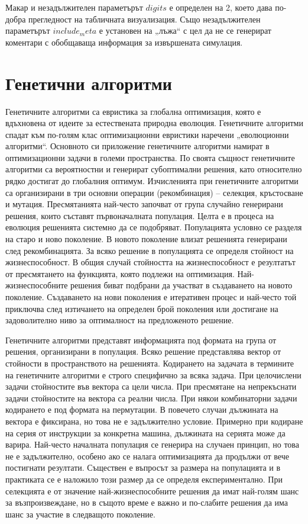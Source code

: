 Макар и незадължителен параметърът $digits$ е определен на 2, което дава по-добра прегледност на табличната визуализация. Също незадължителен параметърът $include_meta$ е установен на „лъжа“ с цел да не се генерират коментари с обобщаваща информация за извършената симулация. 

\section{Генетични алгоритми}

Генетичните алгоритми са евристика за глобална оптимизация, която е вдъхновена от идеите за естествената природна еволюция. Генетичните алгоритми спадат към по-голям клас оптимизационни евристики наречени „еволюционни алгоритми“. Основното си приложение генетичните алгоритми намират в оптимизационни задачи в големи пространства. По своята същност генетичните алгоритми са вероятностни и генерират субоптимални решения, като относително рядко достигат до глобалния оптимум. Изчисленията при генетичните алгоритми са организирани в три основни операции (рекомбинация) – селекция, кръстосване и мутация. Пресмятанията най-често започват от група случайно генерирани решения, които съставят първоначалната популация. Целта е в процеса на еволюция решенията системно да се подобряват. Популацията условно се разделя на старо и ново поколение. В новото поколение влизат решенията генерирани след рекомбинацията. За всяко решение в популацията се определя стойност на жизнеспособност. В общия случай стойността на жизнеспособност е резултатът  от пресмятането на функцията, която подлежи на оптимизация. Най-жизнеспособните решения биват подбрани да участват в създаването на новото поколение. Създаването на нови поколения е итеративен процес и най-често той приключва след изтичането на определен брой поколения или достигане на задоволително ниво за оптималност на предложеното решение. 

Генетичните алгоритми представят информацията под формата на група от решения, организирани в популация. Всяко решение представлява вектор от стойности в пространството на решенията. Кодирането на задачата в термините на генетичните алгоритми е строго специфично за всяка задача. При целочислени задачи стойностите във вектора са цели числа. При пресмятане на непрекъснати задачи стойностите на вектора са реални числа. При някои комбинаторни задачи кодирането е под формата на пермутации. В повечето случаи дължината на вектора е фиксирана, но това не е задължително условие. Примерно при кодиране на серия от инструкции за конкретна машина, дължината на серията може да варира. Най-често началната популация се генерира на случаен принцип, но това не е задължително, особено ако се налага оптимизацията да продължи от вече постигнати резултати. Съществен е въпросът за размера на популацията и в практиката се е наложило този размер да се определя експериментално. При селекцията е от значение най-жизнеспособните решения да имат най-голям шанс за възпроизвеждане, но в същото време е важно и по-слабите решения да има шанс за участие в следващото поколение. 


